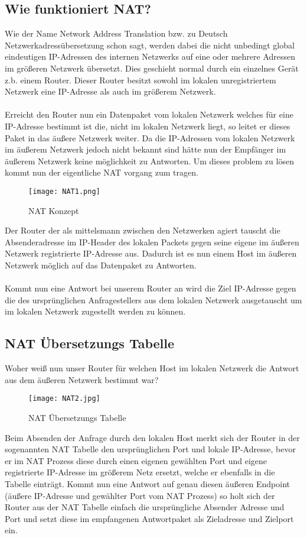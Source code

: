 \subsection{Wie funktioniert NAT?}
Wie der Name Network Address Translation bzw. zu Deutsch Netzwerkadressübersetzung schon sagt, werden dabei die nicht unbedingt global eindeutigen IP-Adressen des internen Netzwerks auf eine oder mehrere Adressen im größeren Netzwerk übersetzt. Dies geschieht normal durch ein einzelnes Gerät z.b. einem Router. Dieser Router besitzt sowohl im lokalen unregistriertem Netzwerk eine IP-Adresse als auch im größerem Netzwerk.
\\\\
Erreicht den Router nun ein Datenpaket vom lokalen Netzwerk welches für eine IP-Adresse bestimmt ist die, nicht im lokalen Netzwerk liegt, so leitet er dieses Paket in das äußere Netzwerk weiter. Da die IP-Adressen vom lokalen Netzwerk im äußerem Netzwerk jedoch nicht bekannt sind hätte nun der Empfänger im äußerem Netzwerk keine möglichkeit zu Antworten. Um dieses problem zu lösen kommt nun der eigentliche NAT vorgang zum tragen. 


\newpage
\begin{figure}[h]
    \centering
    \texttt{[image: NAT1.png]}
    \caption[NAT1]{NAT Konzept}%
\end{figure}
Der Router der als mittelsmann zwischen den Netzwerken agiert tauscht die Absenderadresse im IP-Header des lokalen Packets gegen seine eigene im äußeren Netzwerk registrierte IP-Adresse aus. Dadurch ist es nun einem Host im äußeren Netzwerk möglich auf das Datenpaket zu Antworten. 
\\\\
Kommt nun eine Antwort bei unserem Router an wird die Ziel IP-Adresse gegen die des ursprünglichen Anfragestellers aus dem lokalen Netzwerk ausgetauscht um im lokalen Netzwerk zugestellt werden zu können.
\subsection{NAT Übersetzungs Tabelle}
Woher weiß nun unser Router für welchen Host im lokalen Netzwerk die Antwort aus dem äußeren Netzwerk bestimmt war? 
\begin{figure}[h]
    \centering
    \texttt{[image: NAT2.jpg]}
    \caption[NAT2]{NAT Übersetzungs Tabelle}
\end{figure}
Beim Absenden der Anfrage durch den lokalen Host merkt sich der Router in der sogenannten NAT Tabelle den ursprünglichen Port und lokale IP-Adresse, bevor er im NAT Prozess diese durch einen eigenen gewählten Port und eigene registrierte IP-Adresse im größerem Netz ersetzt, welche er ebenfalls in die Tabelle einträgt. 
Kommt nun eine Antwort auf genau diesen äußeren Endpoint (äußere IP-Adresse und gewählter Port vom NAT Prozess) so holt sich der Router aus der NAT Tabelle einfach die ursprüngliche Absender Adresse und Port und setzt diese im empfangenen Antwortpaket als Zieladresse und Zielport ein. 
